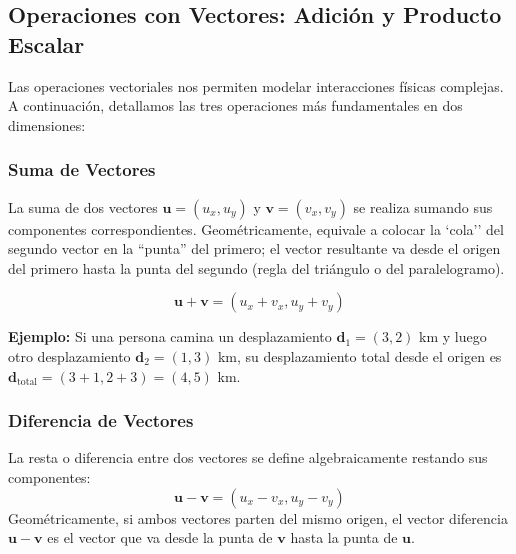 \documentclass[11pt,a4paper]{book}
\begin{document}
\subsection{Operaciones con Vectores: Adición y Producto Escalar}

Las operaciones vectoriales nos permiten modelar interacciones físicas complejas. A continuación, detallamos las tres operaciones más fundamentales en dos dimensiones:

\subsubsection{Suma de Vectores}
La suma de dos vectores $\boldsymbol{u} = (u_x, u_y)$ y $\boldsymbol{v} = (v_x, v_y)$ se realiza sumando sus componentes correspondientes. Geométricamente, equivale a colocar la `cola'' del segundo vector en la ``punta'' del primero; el vector resultante va desde el origen del primero hasta la punta del segundo (regla del triángulo o del paralelogramo).

\begin{equation}
    \boldsymbol{u} + \boldsymbol{v} = (u_x + v_x, u_y + v_y)
\end{equation}

\begin{center}
\end{center}

\textbf{Ejemplo:} Si una persona camina un desplazamiento $\boldsymbol{d}_1 = (3, 2)$ km y luego otro desplazamiento $\boldsymbol{d}_2 = (1, 3)$ km, su desplazamiento total desde el origen es $\boldsymbol{d}_{\text{total}} = (3+1, 2+3) = (4, 5)$ km.

\subsubsection{Diferencia de Vectores}
La resta o diferencia entre dos vectores se define algebraicamente restando sus componentes:
\begin{equation}
    \boldsymbol{u} - \boldsymbol{v} = (u_x - v_x, u_y - v_y)
\end{equation}
Geométricamente, si ambos vectores parten del mismo origen, el vector diferencia $\boldsymbol{u} - \boldsymbol{v}$ es el vector que va desde la punta de $\boldsymbol{v}$ hasta la punta de $\boldsymbol{u}$.
\end{document}
